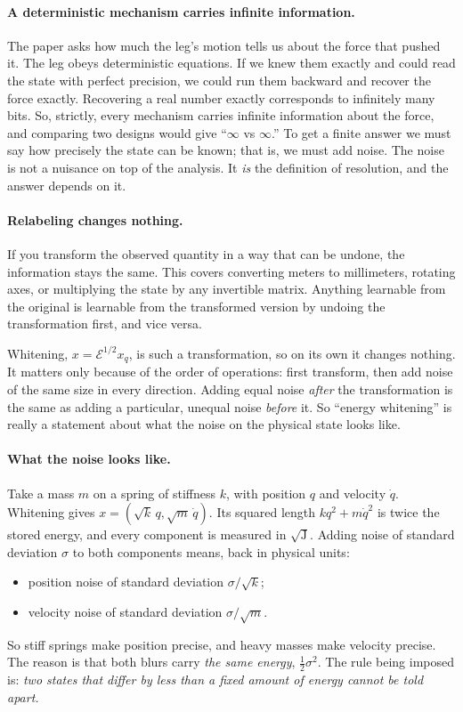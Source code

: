 \documentclass[11pt]{article}
\theoremstyle{definition}
\theoremstyle{remark}
\newcommand{\Em}{\mathcal{E}}         %
\begin{document}
\paragraph{A deterministic mechanism carries infinite information.} The paper asks how much
the leg's motion tells us about the force that pushed it. The leg obeys deterministic
equations. If we knew them exactly and could read the state with perfect precision, we
could run them backward and recover the force exactly. Recovering a real number exactly
corresponds to infinitely many bits. So, strictly, every mechanism carries infinite
information about the force, and comparing two designs would give ``$\infty$ vs
$\infty$.'' To get a finite answer we must say how precisely the state can be known; that
is, we must add noise. The noise is not a nuisance on top of the analysis. It \emph{is}
the definition of resolution, and the answer depends on it.

\paragraph{Relabeling changes nothing.} If you transform the observed quantity in a way
that can be undone, the information stays the same. This covers converting meters to
millimeters, rotating axes, or multiplying the state by any invertible matrix. Anything
learnable from the original is learnable from the transformed version by undoing the
transformation first, and vice versa.

Whitening, $x=\Em^{1/2}x_q$, is such a transformation, so on its own it changes nothing.
It matters only because of the order of operations: first transform, then add noise of the
same size in every direction. Adding equal noise \emph{after} the transformation is the
same as adding a particular, unequal noise \emph{before} it. So ``energy whitening'' is
really a statement about what the noise on the physical state looks like.

\paragraph{What the noise looks like.} Take a mass $m$ on a spring of stiffness $k$, with
position $q$ and velocity $\dot q$. Whitening gives $x=(\sqrt k\,q,\sqrt m\,\dot q)$. Its
squared length $kq^2+m\dot q^2$ is twice the stored energy, and every component is
measured in $\sqrt{\mathrm J}$. Adding noise of standard deviation $\sigma$ to both
components means, back in physical units:
\begin{itemize}[nosep]
  \item position noise of standard deviation $\sigma/\sqrt k$;
  \item velocity noise of standard deviation $\sigma/\sqrt m$.
\end{itemize}
So stiff springs make position precise, and heavy masses make velocity precise. The reason
is that both blurs carry \emph{the same energy}, $\frac12\sigma^2$. The rule being imposed
is: \emph{two states that differ by less than a fixed amount of energy cannot be told
apart.}
\end{document}
